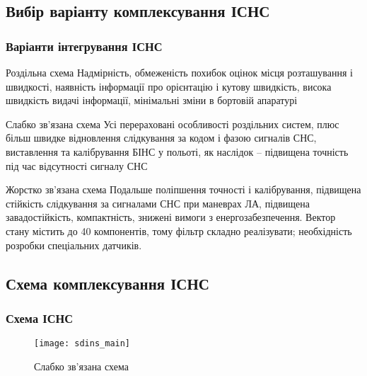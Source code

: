 \documentclass[ucs,compress]{beamer}    %
\begin{document}
\subsection{Вибір варіанту комплексування ІСНС } 
\begin{frame}\frametitle{Варіанти інтегрування ІСНС} 

\tiny
\begin{block}{Роздільна схема}
Надмірність, обмеженість похибок оцінок місця розташування і швидкості, 
наявність інформації про орієнтацію і кутову швидкість, висока швидкість видачі інформації, 
мінімальні зміни в бортовій апаратурі
\end{block}

\begin{exampleblock}{Слабко зв'язана схема}
Усі перераховані особливості роздільних систем, плюс більш швидке відновлення слідкування за кодом і фазою сигналів СНС, виставлення та калібрування 
БІНС у польоті, як наслідок -- підвищена точність під час відсутності сигналу СНС
\end{exampleblock}


\begin{block}{Жорстко зв'язана схема}
Подальше поліпшення точності і калібрування, підвищена стійкість слідкування 
за сигналами СНС при маневрах ЛА, підвищена завадостійкість, компактність, знижені вимоги з енергозабезпечення. Вектор стану містить до 40 компонентів, тому фільтр складно реалізувати; необхідність розробки 
спеціальних датчиків.
\end{block}
\end{frame}


\subsection{Схема комплексування ІСНС }
\begin{frame} \frametitle{Схема ІСНС} 
\begin{figure}[here]
\centering
\texttt{[image: sdins\_main]}
\caption{Слабко зв’язана схема}
\end{figure}
\end{frame}

\end{document}
